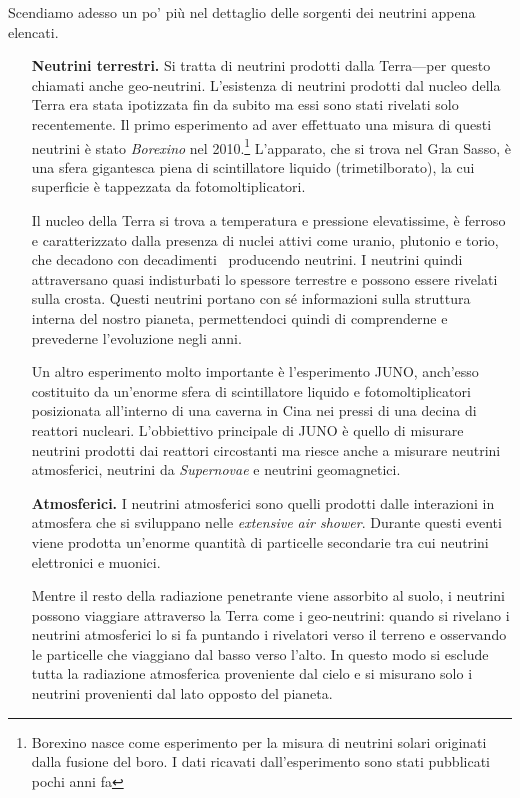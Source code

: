         Scendiamo adesso un po' più nel dettaglio delle sorgenti dei neutrini appena elencati.
        \begin{enumerate}[wide = 0pt, leftmargin = 1.5\parindent]
            \item[\textbf{Neutrini terrestri.}] Si tratta di neutrini prodotti dalla Terra---per questo chiamati anche geo-neutrini. L'esistenza di neutrini prodotti dal nucleo della Terra era stata ipotizzata fin da subito ma essi sono stati rivelati solo recentemente. Il primo esperimento ad aver effettuato una misura di questi neutrini è stato \emph{Borexino} nel 2010.\footnote{Borexino nasce come esperimento per la misura di neutrini solari originati dalla fusione del boro. I dati ricavati dall'esperimento sono stati pubblicati pochi anni fa} L'apparato, che si trova nel Gran Sasso, è una sfera gigantesca piena di scintillatore liquido (trimetilborato), la cui superficie è tappezzata da fotomoltiplicatori.
            
            Il nucleo della Terra si trova a temperatura e pressione elevatissime, è ferroso e caratterizzato dalla presenza di nuclei attivi come uranio, plutonio e torio, che decadono con decadimenti \betap\ producendo neutrini. I neutrini quindi attraversano quasi indisturbati lo spessore terrestre e possono essere rivelati sulla crosta. Questi neutrini portano con sé informazioni sulla struttura interna del nostro pianeta, permettendoci quindi di comprenderne e prevederne l'evoluzione negli anni.
            
            Un altro esperimento molto importante è l'esperimento JUNO, anch'esso costituito da un'enorme sfera di scintillatore liquido e fotomoltiplicatori posizionata all'interno di una caverna in Cina nei pressi di una decina di reattori nucleari. L'obbiettivo principale di JUNO è quello di misurare neutrini prodotti dai reattori circostanti ma riesce anche a misurare neutrini atmosferici, neutrini da \textit{Supernovae} e neutrini geomagnetici.
            
            \item[\textbf{Atmosferici.}] I neutrini atmosferici sono quelli prodotti dalle interazioni in atmosfera che si sviluppano nelle \textit{extensive air shower}. Durante questi eventi viene prodotta un'enorme quantità di particelle secondarie tra cui neutrini elettronici e muonici.
            
            Mentre il resto della radiazione penetrante viene assorbito al suolo, i neutrini possono viaggiare attraverso la Terra come i geo-neutrini: quando si rivelano i neutrini atmosferici lo si fa puntando i rivelatori verso il terreno e osservando le particelle che viaggiano dal basso verso l'alto. In questo modo si esclude tutta la radiazione atmosferica proveniente dal cielo e si misurano solo i neutrini provenienti dal lato opposto del pianeta.


\end{enumerate}
